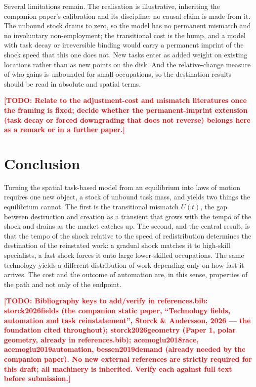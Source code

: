 \documentclass[12pt, a4paper]{article}
\newcommand{\todo}[1]{\textcolor{red}{\textbf{[TODO: #1]}}}
\begin{document}
Several limitations remain. The realisation is illustrative, inheriting
the companion paper's calibration and its discipline: no causal claim is
made from it. The unbound stock drains to zero, so the model has no
permanent mismatch and no involuntary non-employment; the transitional
cost is the hump, and a model with task decay or irreversible binding
would carry a permanent imprint of the shock speed that this one does
not. New tasks enter as added weight on existing locations rather than as
new points on the disk. And the relative-change measure of who gains is
unbounded for small occupations, so the destination results should be
read in absolute and spatial terms.

\todo{Relate to the adjustment-cost and mismatch literatures once the
framing is fixed; decide whether the permanent-imprint extension (task
decay or forced downgrading that does not reverse) belongs here as a
remark or in a further paper.}

\section{Conclusion}
\label{sec:conclusion}

Turning the spatial task-based model from an equilibrium into laws of
motion requires one new object, a stock of unbound task mass, and yields
two things the equilibrium cannot. The first is the transitional
mismatch $U(t)$, the gap between destruction and creation as a transient
that grows with the tempo of the shock and drains as the market catches
up. The second, and the central result, is that the tempo of the shock
relative to the speed of redistribution determines the destination of the
reinstated work: a gradual shock matches it to high-skill specialists, a
fast shock forces it onto large lower-skilled occupations. The same
technology yields a different distribution of work depending only on how
fast it arrives. The cost and the outcome of automation are, in this
sense, properties of the path and not only of the endpoint.

\printbibliography

\todo{Bibliography keys to add/verify in references.bib:
storck2026fields (the companion static paper, ``Technology fields,
automation and task reinstatement'', Storck \& Andersson, 2026 --- the
foundation cited throughout); storck2026geometry (Paper 1, polar
geometry, already in references.bib); acemoglu2018race,
acemoglu2019automation, bessen2019demand (already needed by the companion
paper). No new external references are strictly required for this draft;
all machinery is inherited. Verify each against full text before
submission.}
\end{document}
